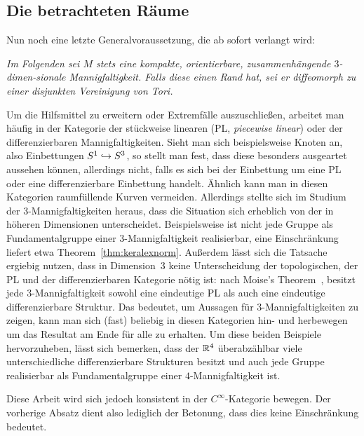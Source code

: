     \subsection{Die betrachteten Räume}
    	Nun noch eine letzte Generalvoraussetzung, die ab sofort verlangt wird:

       \emph{Im Folgenden sei $M$ stets eine kompakte, orientierbare, zusammenhängende $3$-dimen-sionale Mannigfaltigkeit. Falls diese einen Rand hat, sei er diffeomorph zu einer disjunkten Vereinigung von Tori.}

        Um die Hilfsmittel zu erweitern oder Extremfälle auszuschließen, arbeitet man häufig in der Kategorie der stückweise linearen (PL, \textit{piecewise linear}) oder der differenzierbaren Mannigfaltigkeiten. Sieht man sich beispielsweise Knoten an, also Einbettungen $S^1 \hookrightarrow S^3$, so stellt man fest, dass diese besonders ausgeartet aussehen können, allerdings nicht, falls es sich bei der Einbettung um eine PL oder eine differenzierbare Einbettung handelt. Ähnlich kann man in diesen Kategorien raumfüllende Kurven vermeiden. Allerdings stellte sich im Studium der $3$-Mannigfaltigkeiten heraus, dass die Situation sich erheblich von der in höheren Dimensionen unterscheidet. Beispielsweise ist nicht jede Gruppe als Fundamentalgruppe einer $3$-Mannigfaltigkeit realisierbar, eine Einschränkung liefert etwa Theorem~\ref{thm:keralexnorm}. Außerdem lässt sich die Tatsache ergiebig nutzen, dass in Dimension~$3$ keine Unterscheidung der topologischen, der PL und der differenzierbaren Kategorie nötig ist: nach Moise's Theorem~\cite{Moise.1952}, besitzt jede $3$-Mannigfaltigkeit sowohl eine eindeutige PL als auch eine eindeutige differenzierbare Struktur. Das bedeutet, um Aussagen für $3$-Mannigfaltigkeiten zu zeigen, kann man sich (fast) beliebig in diesen Kategorien hin- und herbewegen um das Resultat am Ende für alle zu erhalten. Um diese beiden Beispiele hervorzuheben, lässt sich bemerken, dass der $\mathbb{R}^4$ überabzählbar viele unterschiedliche differenzierbare Strukturen besitzt und auch jede Gruppe realisierbar als Fundamentalgruppe einer $4$-Mannigfaltigkeit ist.

        Diese Arbeit wird sich jedoch konsistent in der $C^\infty$-Kategorie bewegen. Der vorherige Absatz dient also lediglich der Betonung, dass dies keine Einschränkung bedeutet. 